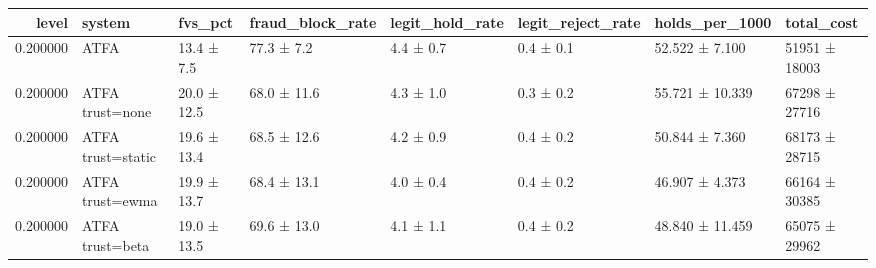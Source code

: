\begin{tabular}{rlllllll}
\toprule
level & system & fvs\_pct & fraud\_block\_rate & legit\_hold\_rate & legit\_reject\_rate & holds\_per\_1000 & total\_cost \\
\midrule
0.200000 & ATFA & 13.4 ± 7.5 & 77.3 ± 7.2 & 4.4 ± 0.7 & 0.4 ± 0.1 & 52.522 ± 7.100 & 51951 ± 18003 \\
0.200000 & ATFA trust=none & 20.0 ± 12.5 & 68.0 ± 11.6 & 4.3 ± 1.0 & 0.3 ± 0.2 & 55.721 ± 10.339 & 67298 ± 27716 \\
0.200000 & ATFA trust=static & 19.6 ± 13.4 & 68.5 ± 12.6 & 4.2 ± 0.9 & 0.4 ± 0.2 & 50.844 ± 7.360 & 68173 ± 28715 \\
0.200000 & ATFA trust=ewma & 19.9 ± 13.7 & 68.4 ± 13.1 & 4.0 ± 0.4 & 0.4 ± 0.2 & 46.907 ± 4.373 & 66164 ± 30385 \\
0.200000 & ATFA trust=beta & 19.0 ± 13.5 & 69.6 ± 13.0 & 4.1 ± 1.1 & 0.4 ± 0.2 & 48.840 ± 11.459 & 65075 ± 29962 \\
\bottomrule
\end{tabular}
